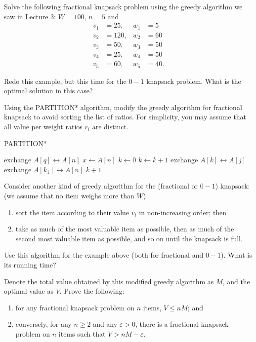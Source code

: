 
\question Solve the following fractional knapsack problem using the greedy algorithm we saw in Lecture 3: $W = 100$, $n = 5$ and
\begin{align*}
    v_1 &= 25,  & w_1 &= 5  \\
    v_2 &= 120, & w_2 &= 60 \\
    v_3 &= 50,  & w_3 &= 50 \\
    v_4 &= 25,  & w_4 &= 50 \\
    v_5 &= 60,  & w_5 &= 40.
\end{align*}

\question Redo this example, but this time for the $0-1$ knapsack problem. What is the optimal solution in this case?

\question Using the \textsc{PARTITION*} algorithm, modify the greedy algorithm for fractional knapsack to avoid sorting the list of ratios.
For simplicity, you may assume that all value per weight ratios $r_i$ are distinct.

\begin{algorithm}
    \caption{PARTITION*}
    \begin{algorithmic}[1]
            \State exchange $A[q] \leftrightarrow A[n]$
            \State $x \gets A[n]$
            \State $k \gets 0$
                    \State $k \gets k + 1$
                    \State exchange $A[k] \leftrightarrow A[j]$
                \EndIf
            \EndFor
            \State exchange $A[k _ 1] \leftrightarrow A[n]$
            \State \Return $k + 1$
        \EndProcedure
    \end{algorithmic}
\end{algorithm}

\question Consider another kind of greedy algorithm for the (fractional or $0-1$) knapsack: (we assume that no item weighs more than $W$)
\begin{enumerate}
    \item sort the item according to their value $v_i$ in non-increasing order; then
    \item take as much of the most valuable item as possible, then as much of the second most valuable item as possible, and so on until the knapsack is full.
\end{enumerate}
Use this algorithm for the example above (both for fractional and $0-1$). What is its running time?

\question Denote the total value obtained by this modified greedy algorithm as $M$, and the optimal value as $V$. Prove the following:
\begin{enumerate}
    \item for any fractional knapsack problem on $n$ items, $V \leq nM$; and
    \item conversely, for any $n \geq 2$ and any $\varepsilon > 0$, there is a fractional knapsack problem on $n$ items such that $V > nM - \varepsilon$.
\end{enumerate}
